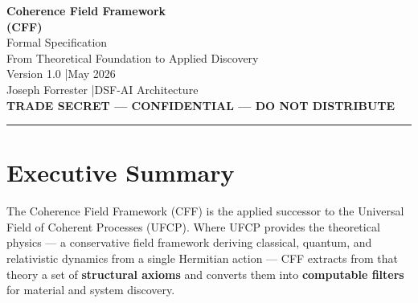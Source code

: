 \documentclass[11pt, a4paper]{article}
\begin{document}
\begin{center}
  {\LARGE \textbf{Coherence Field Framework}}\\[4pt]
  {\LARGE \textbf{(CFF)}}\\[8pt]
  {\large Formal Specification}\\[4pt]
  {\large From Theoretical Foundation to Applied Discovery}\\[12pt]
  {\color{nm-gray}\small Version 1.0 \quad|\quad May 2026}\\[4pt]
  {\color{nm-gray}\small Joseph Forrester \quad|\quad DSF-AI Architecture}\\[4pt]
  \textcolor{nm-red}{\textbf{TRADE SECRET --- CONFIDENTIAL --- DO NOT DISTRIBUTE}}
\end{center}

\vspace{1em}\hrule\vspace{1em}

\begin{center}
\end{center}

\newpage
\tableofcontents
\newpage

\section*{Executive Summary}

The Coherence Field Framework (CFF) is the applied successor to the
Universal Field of Coherent Processes (UFCP). Where UFCP provides the
theoretical physics --- a conservative field framework deriving classical,
quantum, and relativistic dynamics from a single Hermitian action ---
CFF extracts from that theory a set of \textbf{structural axioms} and
converts them into \textbf{computable filters} for material and system
discovery.
\end{document}
